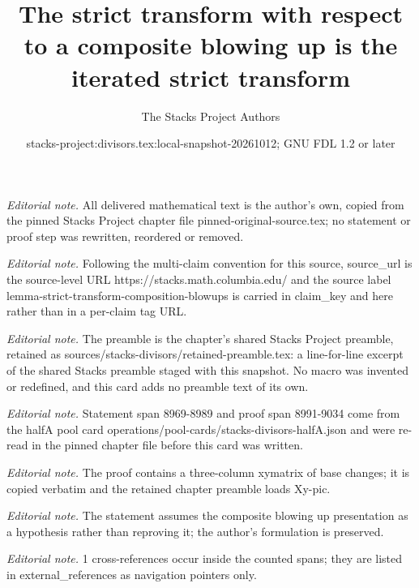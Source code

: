 \documentclass[10pt,a4paper]{amsart}
\title{The strict transform with respect to a composite blowing up is the iterated strict transform}
\author{The Stacks Project Authors}
\date{stacks-project:divisors.tex:local-snapshot-20261012; GNU FDL 1.2 or later}
\theoremstyle{plain}
\theoremstyle{definition}
\theoremstyle{remark}
\numberwithin{equation}{subsection}
\begin{document}
\maketitle
\noindent\textit{Editorial note.} All delivered mathematical text is the author's own, copied from the pinned Stacks Project chapter file pinned-original-source.tex; no statement or proof step was rewritten, reordered or removed.\par\medskip
\noindent\textit{Editorial note.} Following the multi-claim convention for this source, source\_url is the source-level URL https://stacks.math.columbia.edu/ and the source label lemma-strict-transform-composition-blowups is carried in claim\_key and here rather than in a per-claim tag URL.\par\medskip
\noindent\textit{Editorial note.} The preamble is the chapter's shared Stacks Project preamble, retained as sources/stacks-divisors/retained-preamble.tex: a line-for-line excerpt of the shared Stacks preamble staged with this snapshot. No macro was invented or redefined, and this card adds no preamble text of its own.\par\medskip
\noindent\textit{Editorial note.} Statement span 8969-8989 and proof span 8991-9034 come from the halfA pool card operations/pool-cards/stacks-divisors-halfA.json and were re-read in the pinned chapter file before this card was written.\par\medskip
\noindent\textit{Editorial note.} The proof contains a three-column xymatrix of base changes; it is copied verbatim and the retained chapter preamble loads Xy-pic.\par\medskip
\noindent\textit{Editorial note.} The statement assumes the composite blowing up presentation as a hypothesis rather than reproving it; the author's formulation is preserved.\par\medskip
\noindent\textit{Editorial note.} 1 cross-references occur inside the counted spans; they are listed in external\_references as navigation pointers only.\par\medskip
\end{document}
